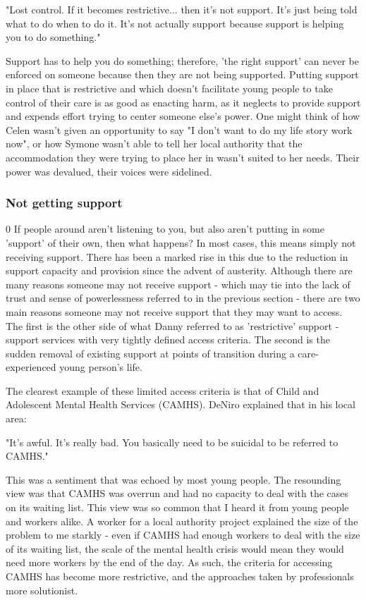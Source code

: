 "Lost control. If it becomes restrictive... then it's not support. It's just being told what to do when to do it. It's not actually support because support is helping you to do something."

Support has to help you do something; therefore, 'the right support' can never be enforced on someone because then they are not being supported. Putting support in place that is restrictive and which doesn't facilitate young people to take control of their care is as good as enacting harm, as it neglects to provide support and expends effort trying to center someone else's power. One might think of how Celen wasn't given an opportunity to say "I don't want to do my life story work now", or how Symone wasn't able to tell her local authority that the accommodation they were trying to place her in wasn't suited to her needs. Their power was devalued, their voices were sidelined.

\subsubsection{Not getting support}0
If people around aren't listening to you, but also aren't putting in some 'support' of their own, then what happens? In most cases, this means simply not receiving support. There has been a marked rise in this due to the reduction in support capacity and provision since the advent of austerity. Although there are many reasons someone may not receive support - which may tie into the lack of trust and sense of powerlessness referred to in the previous section - there are two main reasons someone may not receive support that they may want to access. The first is the other side of what Danny referred to as 'restrictive' support - support services with very tightly defined access criteria. The second is the sudden removal of existing support at points of transition during a care-experienced young person's life.

The clearest example of these limited access criteria is that of Child and Adolescent Mental Health Services (CAMHS). DeNiro explained that in his local area:

"It's awful. It's really bad. You basically need to be suicidal to be referred to CAMHS."

This was a sentiment that was echoed by most young people. The resounding view was that CAMHS was overrun and had no capacity to deal with the cases on its waiting list. This view was so common that I heard it from young people and workers alike. A worker for a local authority project explained the size of the problem to me starkly - even if CAMHS had enough workers to deal with the size of its waiting list, the scale of the mental health crisis would mean they would need more workers by the end of the day. As such, the criteria for accessing CAMHS has become more restrictive, and the approaches taken by professionals more solutionist.


